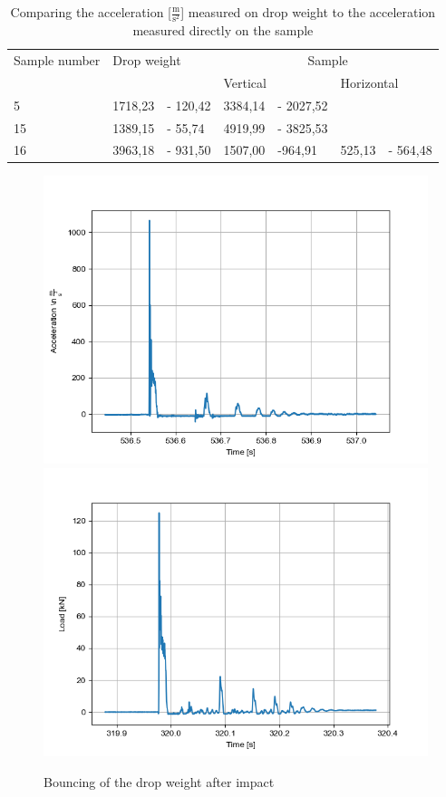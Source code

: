 \begin{table}
    \centering
    \begin{tabular}{lllllll}
    \toprule
    Sample number		&   \multicolumn{2}{l}{Drop weight}	& \multicolumn{4}{c}{Sample} \\
    \cmidrule{4 - 7}
    			&		&							& \multicolumn{2}{l}{Vertical}	& \multicolumn{2}{l}{Horizontal}    \\
    \midrule
    5  & 1718,23 & - 120,42 & 3384,14 & - 2027,52 & &\\
    15 & 1389,15 & - 55,74 & 4919,99 & - 3825,53 & &\\
    16 & 3963,18 & - 931,50 & 1507,00 & -964,91 & 525,13 & - 564,48\\
    \bottomrule
    \end{tabular}
    \caption{Comparing the acceleration [$\frac{\text{m}}{\text{s}^2}$] measured on drop weight to the acceleration measured directly on the sample}
    \label{tab:acc_compare}
\end{table}


\begin{figure} 
\centering 
{}
{\includegraphics[width=0.45\linewidth]{pics/accelbounce.png}} 
{\includegraphics[width=0.45\linewidth]{pics/loadbounce.png}}

\caption{Bouncing of the drop weight after impact}
\label{fig:Bounce} 
\end{figure}

